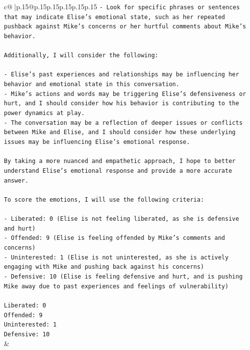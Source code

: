 \documentclass{article}
\begin{document}
{\begin{supertabular}{c@{$\;$}|p{.15\linewidth}@{}p{.15\linewidth}p{.15\linewidth}p{.15\linewidth}p{.15\linewidth}p{.15\linewidth}}
{{{\texttt{{-} Look for specific phrases or sentences that may indicate Elise's emotional state, such as her repeated pushback against Mike's concerns or her hurtful comments about Mike's behavior.} \\
\\ 
\texttt{Additionally, I will consider the following:} \\
\\ 
\texttt{{-} Elise's past experiences and relationships may be influencing her behavior and emotional state in this conversation.} \\
\texttt{{-} Mike's actions and words may be triggering Elise's defensiveness or hurt, and I should consider how his behavior is contributing to the power dynamics at play.} \\
\texttt{{-} The conversation may be a reflection of deeper issues or conflicts between Mike and Elise, and I should consider how these underlying issues may be influencing Elise's emotional response.} \\
\\ 
\texttt{By taking a more nuanced and empathetic approach, I hope to better understand Elise's emotional response and provide a more accurate answer.} \\
\\ 
\texttt{To score the emotions, I will use the following criteria:} \\
\\ 
\texttt{{-} Liberated: 0 (Elise is not feeling liberated, as she is defensive and hurt)} \\
\texttt{{-} Offended: 9 (Elise is feeling offended by Mike's comments and concerns)} \\
\texttt{{-} Uninterested: 1 (Elise is not uninterested, as she is actively engaging with Mike and pushing back against his concerns)} \\
\texttt{{-} Defensive: 10 (Elise is feeling defensive and hurt, and is pushing Mike away due to past experiences and feelings of vulnerability)} \\
\\ 
\texttt{Liberated: 0} \\
\texttt{Offended: 9} \\
\texttt{Uninterested: 1} \\
\texttt{Defensive: 10} \\
            }
        }
    }
    & \\ \\

\end{supertabular}
}
\end{document}
